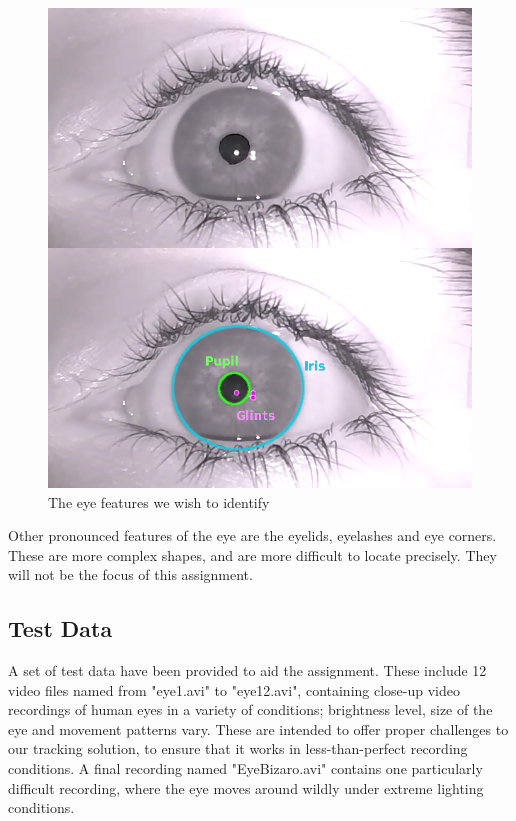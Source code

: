 \begin{figure}[h]
	\centering
	\includegraphics[scale=0.6]{eye_terms.png}
	\caption{The eye features we wish to identify}
\end{figure}

Other pronounced features of the eye are the eyelids, eyelashes and eye corners. These are more complex shapes, and are more difficult to locate precisely. They will not be the focus of this assignment.\\

\subsection{Test Data}
	A set of test data have been provided to aid the assignment. These include 12 video files named from "eye1.avi" to "eye12.avi", containing close-up video recordings of human eyes in a variety of conditions; brightness level, size of the eye and movement patterns vary. These are intended to offer proper challenges to our tracking solution, to ensure that it works in less-than-perfect recording conditions. A final recording named "EyeBizaro.avi" contains one particularly difficult recording, where the eye moves around wildly under extreme lighting conditions.\\
	

